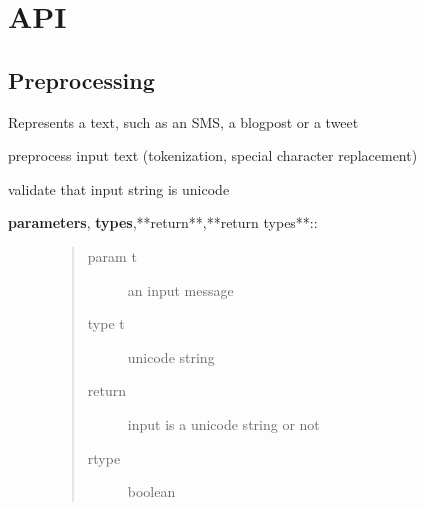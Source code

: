 \documentclass[letterpaper,10pt,english]{sphinxmanual}
\begin{document}
\chapter{API}
\label{API:api}\label{API::doc}

\section{Preprocessing}
\label{API:module-norm.data}\label{API:preprocessing}

\begin{fulllineitems}
\label{API:norm.data.Text}
Represents a text, such as an SMS, a blogpost or a tweet

\begin{fulllineitems}
\label{API:norm.data.Text._preprocess}
preprocess input text (tokenization, special character replacement)

\end{fulllineitems}


\begin{fulllineitems}
\label{API:norm.data.Text._validate_input}
validate that input string is unicode
\begin{description}
\item[{\textbf{parameters}, \textbf{types},**return**,**return types**::}] \leavevmode\begin{quote}\begin{description}
\item[{param t}] \leavevmode
an input message

\item[{type t}] \leavevmode
unicode string

\item[{return}] \leavevmode
input is a unicode string or not

\item[{rtype}] \leavevmode
boolean

\end{description}\end{quote}

\end{description}

\end{fulllineitems}


\end{fulllineitems}
\end{document}

